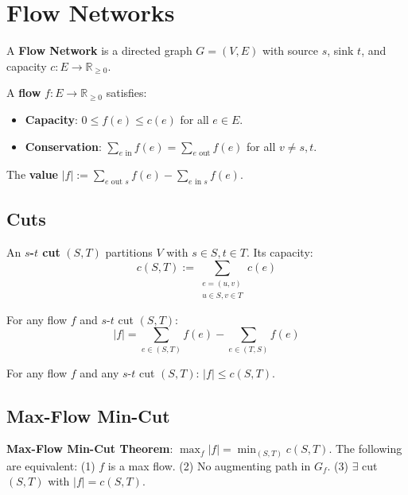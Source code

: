 \section{Flow Networks}

\begin{definition}
	A \textbf{Flow Network} is a directed graph $G = (V, E)$ with source $s$, sink $t$, and capacity $c: E \to \mathbb{R}_{\geq 0}$.
\end{definition}

\begin{definition}
	A \textbf{flow} $f: E \to \mathbb{R}_{\geq 0}$ satisfies:
	\begin{itemize}
		\item \textbf{Capacity}: $0 \leq f(e) \leq c(e)$ for all $e \in E$.
		\item \textbf{Conservation}: $\sum_{e \text{ in}} f(e) = \sum_{e \text{ out}} f(e)$ for all $v \neq s,t$.
	\end{itemize}
	The \textbf{value} $|f| := \sum_{e \text{ out } s} f(e) - \sum_{e \text{ in } s} f(e)$.
\end{definition}

\subsection{Cuts}

\begin{definition}
	An \textbf{$s$-$t$ cut} $(S,T)$ partitions $V$ with $s \in S, t \in T$. Its capacity:
	$$c(S,T) := \sum_{\substack{e=(u,v) \\ u \in S, v \in T}} c(e)$$
\end{definition}

\begin{lemma}
	For any flow $f$ and $s$-$t$ cut $(S,T)$:
	$$|f| = \sum_{e \in (S,T)} f(e) - \sum_{e \in (T,S)} f(e)$$
\end{lemma}

\begin{theorem}
	For any flow $f$ and any $s$-$t$ cut $(S,T)$: $|f| \leq c(S,T)$.
\end{theorem}

\subsection{Max-Flow Min-Cut}

\begin{theorem}
	\textbf{Max-Flow Min-Cut Theorem}: $\max_f |f| = \min_{(S,T)} c(S,T)$.
	The following are equivalent: (1) $f$ is a max flow. (2) No augmenting path in $G_f$. (3) $\exists$ cut $(S,T)$ with $|f| = c(S,T)$.
\end{theorem}

